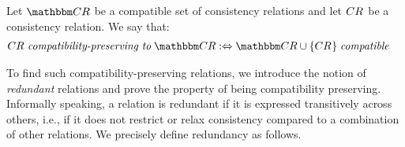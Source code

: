 \begin{definition}
    \label{def:compatibilitypreserving}
    Let $\consistencyrelationset{CR}$ be a compatible set of consistency relations and let $\consistencyrelation{CR}{}$ be a consistency relation. We say that:
    \begin{align*}
        &
        \consistencyrelation{CR}{} \compatibilitypreservingtomath \consistencyrelationset{CR} \equivalentperdefinition %
        \consistencyrelationset{CR} \cup \setted{\consistencyrelation{CR}{}} \compatiblemath
    \end{align*}
\end{definition}

To find such compatibility-preserving relations, we introduce the notion of \emph{redundant} relations and prove the property of being compatibility preserving.
Informally speaking, a relation is redundant if it is expressed transitively across others, i.e., if it does not restrict or relax consistency compared to a combination of other relations.
We precisely define redundancy as follows.



